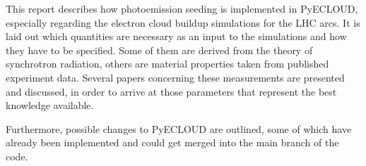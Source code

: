 
This report describes how photoemission seeding is implemented in PyECLOUD, especially regarding the electron cloud buildup simulations for the LHC arcs.
It is laid out which quantities are necessary as an input to the simulations and how they have to be specified.
Some of them are derived from the theory of synchrotron radiation, others are material properties taken from published experiment data.
Several papers concerning these measurements are presented and discussed, in order to arrive at those parameters that represent the best knowledge available.

Furthermore, possible changes to PyECLOUD are outlined, some of which have already been implemented and could get merged into the main branch of the code.

